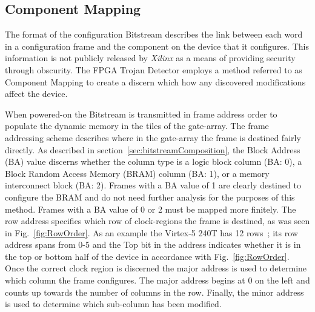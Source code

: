 \documentclass[journal, hidelinks]{IEEEtran}
\begin{document}
\subsection{Component Mapping} \label{sec:tileMapping}
The format of the configuration Bitstream describes the link between each word in a configuration frame and the component on the device that it configures. This information is not publicly released by \textit{Xilinx} as a means of providing security through obscurity.
The FPGA Trojan Detector employs a method referred to as Component Mapping to create a discern which how any discovered modifications affect the device.

When powered-on the Bitstream is transmitted in frame address order to populate the dynamic memory in the tiles of the gate-array.
The frame addressing scheme describes where in the gate-array the frame is destined fairly directly.
As described in section~\ref{sec:bitstreamComposition}, the Block Address (BA) value discerns whether the column type is a logic block column (BA: 0), a Block Random Access Memory (BRAM) column (BA: 1), or a memory interconnect block (BA: 2).
Frames with a BA value of 1 are clearly destined to configure the BRAM and do not need further analysis for the purposes of this method.
Frames with a BA value of 0 or 2 must be mapped more finitely.
The row address specifies which row of clock-regions the frame is destined, as was seen in Fig.~\ref{fig:RowOrder}.
As an example the Virtex-5 240T has 12 rows~\cite{virtex5ConfigGuide}; its row address spans from 0-5 and the Top bit in the address indicates whether it is in the top or bottom half of the device in accordance with Fig.~\ref{fig:RowOrder}.
Once the correct clock region is discerned the major address is used to determine which column the frame configures.
The major address begins at 0 on the left and counts up towards the number of columns in the row.
Finally, the minor address is used to determine which sub-column has been modified.
\end{document}
